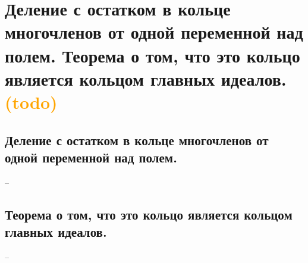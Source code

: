 \section{Деление с остатком в кольце многочленов от одной переменной над полем. Теорема о том, что это кольцо является кольцом главных идеалов. \textcolor{orange}{(todo)}}

\subsection{Деление с остатком в кольце многочленов от одной переменной над полем.}
--
\subsection{Теорема о том, что это кольцо является кольцом главных идеалов.}
--